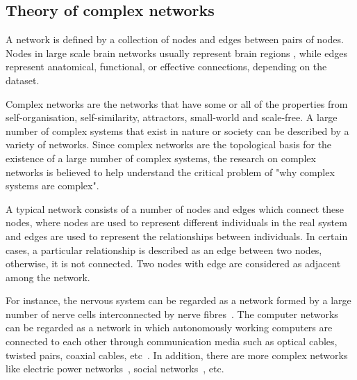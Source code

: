 
\subsection{Theory of complex networks}
A network is defined by a collection of nodes and edges between pairs of nodes. Nodes in large scale brain networks usually represent brain regions \cite{rubinov2010complex}, while edges represent anatomical, functional, or effective connections, depending on the dataset.

Complex networks are the networks that have some or all of the properties from self-organisation, self-similarity, attractors, small-world and scale-free. A large number of complex systems that exist in nature or society can be described by a variety of networks. Since complex networks are the topological basis for the existence of a large number of complex systems, the research on complex networks is believed to help understand the critical problem of "why complex systems are complex".

A typical network consists of a number of nodes and edges which connect these nodes, where nodes are used to represent different individuals in the real system and edges are used to represent the relationships between individuals. In certain cases, a particular relationship is described as an edge between two nodes, otherwise, it is not connected. Two nodes with edge are considered as adjacent among the network.

For instance, the nervous system can be regarded as a network formed by a large number of nerve cells interconnected by nerve fibres~\cite{watts1998collective}. The computer networks can be regarded as a network in which autonomously working computers are connected to each other through communication media such as optical cables, twisted pairs, coaxial cables, etc~\cite{watts1998collective}. In addition, there are more complex networks like electric power networks~\cite{faloutsos1999power}, social networks~\cite{watts1998collective, hofman2017prediction, ebel2002scale}, etc.

